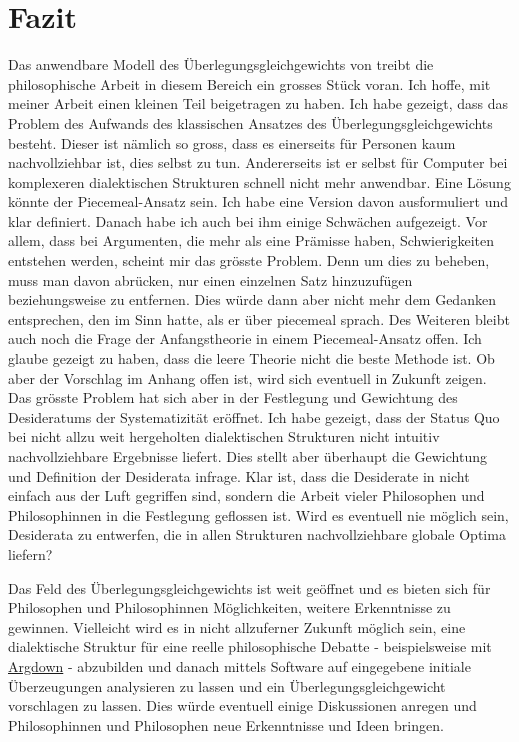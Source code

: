 \documentclass{article}
\begin{document}
\section{Fazit}
Das anwendbare Modell des Überlegungsgleichgewichts von \citeauthor{beisbart_making_2021} treibt die philosophische Arbeit in diesem Bereich ein grosses Stück voran. Ich hoffe, mit meiner Arbeit einen kleinen Teil beigetragen zu haben. Ich habe gezeigt, dass das Problem des Aufwands des klassischen Ansatzes des Überlegungsgleichgewichts besteht. Dieser ist nämlich so gross, dass es einerseits für Personen kaum nachvollziehbar ist, dies selbst zu tun. Andererseits ist er selbst für Computer bei komplexeren dialektischen Strukturen schnell nicht mehr anwendbar. Eine Lösung könnte der Piecemeal-Ansatz sein. Ich habe eine Version davon ausformuliert und klar definiert. Danach habe ich auch bei ihm einige Schwächen aufgezeigt. Vor allem, dass bei Argumenten, die mehr als eine Prämisse haben, Schwierigkeiten entstehen werden, scheint mir das grösste Problem. Denn um dies zu beheben, muss man davon abrücken, nur einen einzelnen Satz hinzuzufügen beziehungsweise zu entfernen. Dies würde dann aber nicht mehr dem Gedanken entsprechen, den \autocite{goodman_fact_1983} im Sinn hatte, als er über piecemeal sprach. Des Weiteren bleibt auch noch die Frage der Anfangstheorie in einem Piecemeal-Ansatz offen. Ich glaube gezeigt zu haben, dass die leere Theorie nicht die beste Methode ist. Ob aber der Vorschlag im Anhang offen ist, wird sich eventuell in Zukunft zeigen.
Das grösste Problem hat sich aber in der Festlegung und Gewichtung des Desideratums der Systematizität eröffnet. Ich habe gezeigt, dass der Status Quo bei nicht allzu weit hergeholten dialektischen Strukturen nicht intuitiv nachvollziehbare Ergebnisse liefert. Dies stellt aber überhaupt die Gewichtung und Definition der Desiderata infrage. Klar ist, dass die Desiderate in \autocite{beisbart_making_2021} nicht einfach aus der Luft gegriffen sind, sondern die Arbeit vieler Philosophen und Philosophinnen in die Festlegung geflossen ist. Wird es eventuell nie möglich sein, Desiderata zu entwerfen, die in allen Strukturen nachvollziehbare globale Optima liefern?

Das Feld des Überlegungsgleichgewichts ist weit geöffnet und es bieten sich für Philosophen und Philosophinnen Möglichkeiten, weitere Erkenntnisse zu gewinnen. Vielleicht wird es in nicht allzuferner Zukunft möglich sein, eine dialektische Struktur für eine reelle philosophische Debatte - beispielsweise mit \href{https://argdown.org/}{Argdown} - abzubilden und danach mittels Software auf eingegebene initiale Überzeugungen analysieren zu lassen und ein Überlegungsgleichgewicht vorschlagen zu lassen. Dies würde eventuell einige Diskussionen anregen und Philosophinnen und Philosophen neue Erkenntnisse und Ideen bringen.
\end{document}
